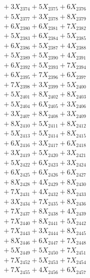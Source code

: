 \documentclass[a4paper,10pt]{article}
\begin{document}
{\begin{align}
&\;  + 3 X_{2374} + 5 X_{2375} + 6 X_{2376} \\[0.3ex]
&\;  + 5 X_{2377} + 3 X_{2378} + 8 X_{2379} \\[0.5ex]\allowbreak
&\;  + 6 X_{2380} + 6 X_{2381} + 7 X_{2382} \\[0.3ex]
&\;  + 5 X_{2383} + 6 X_{2384} + 5 X_{2385} \\[0.3ex]
&\;  + 6 X_{2386} + 5 X_{2387} + 4 X_{2388} \\[0.3ex]
&\;  + 5 X_{2389} + 5 X_{2390} + 4 X_{2391} \\[0.3ex]
&\;  + 6 X_{2392} + 5 X_{2393} + 7 X_{2394} \\[0.3ex]
&\;  + 6 X_{2395} + 7 X_{2396} + 6 X_{2397} \\[0.3ex]
&\;  + 7 X_{2398} + 3 X_{2399} + 5 X_{2400} \\[0.3ex]
&\;  + 5 X_{2401} + 8 X_{2402} + 8 X_{2403} \\[0.3ex]
&\;  + 5 X_{2404} + 6 X_{2405} + 3 X_{2406} \\[0.3ex]
&\;  + 3 X_{2407} + 8 X_{2408} + 3 X_{2409} \\[0.5ex]\allowbreak
&\;  + 8 X_{2410} + 5 X_{2411} + 8 X_{2412} \\[0.3ex]
&\;  + 5 X_{2413} + 5 X_{2414} + 8 X_{2415} \\[0.3ex]
&\;  + 6 X_{2416} + 3 X_{2417} + 6 X_{2418} \\[0.3ex]
&\;  + 3 X_{2419} + 5 X_{2420} + 3 X_{2421} \\[0.3ex]
&\;  + 5 X_{2422} + 6 X_{2423} + 3 X_{2424} \\[0.3ex]
&\;  + 6 X_{2425} + 6 X_{2426} + 6 X_{2427} \\[0.3ex]
&\;  + 8 X_{2428} + 4 X_{2429} + 8 X_{2430} \\[0.3ex]
&\;  + 7 X_{2431} + 4 X_{2432} + 8 X_{2433} \\[0.3ex]
&\;  + 3 X_{2434} + 7 X_{2435} + 8 X_{2436} \\[0.3ex]
&\;  + 7 X_{2437} + 8 X_{2438} + 4 X_{2439} \\[0.5ex]\allowbreak
&\;  + 7 X_{2440} + 8 X_{2441} + 5 X_{2442} \\[0.3ex]
&\;  + 7 X_{2443} + 3 X_{2444} + 8 X_{2445} \\[0.3ex]
&\;  + 8 X_{2446} + 6 X_{2447} + 7 X_{2448} \\[0.3ex]
&\;  + 5 X_{2449} + 5 X_{2450} + 7 X_{2451} \\[0.3ex]
&\;  + 7 X_{2452} + 5 X_{2453} + 7 X_{2454} \\[0.3ex]
&\;  + 7 X_{2455} + 4 X_{2456} + 6 X_{2457} \\[0.3ex]

\end{align}}
\end{document}
